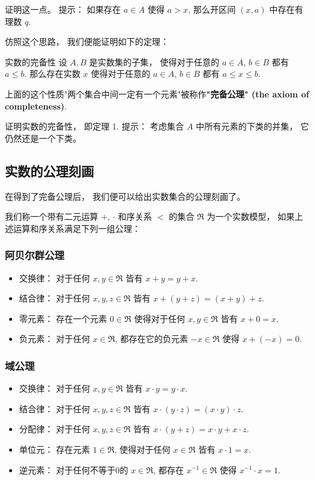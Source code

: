 \begin{exercise}{}
证明这一点。 提示： 如果存在 $a\in A$ 使得 $a>x$, 那么开区间 $(x,a)$ 中存在有理数 $q$.
\end{exercise}

仿照这个思路， 我们便能证明如下的定理：

\begin{theorem}{实数的完备性}\label{Cmplt_the1}
设 $A,B$ 是实数集的子集， 使得对于任意的 $a\in A$, $b\in B$ 都有 $a\leq b$. 那么存在实数 $x$ 使得对于任意的 $a\in A$, $b\in B$ 都有 $a\leq x\leq b$.
\end{theorem}

上面的这个性质"两个集合中间一定有一个元素"被称作\textbf{"完备公理" (the axiom of completeness)}.

\begin{exercise}{}
证明实数的完备性， 即定理 1. 提示： 考虑集合 $A$ 中所有元素的下类的并集， 它仍然还是一个下类。
\end{exercise}

\subsection{实数的公理刻画}

在得到了完备公理后， 我们便可以给出实数集合的公理刻画了。 

我们称一个带有二元运算 $+$, $\cdot$ 和序关系 $<$ 的集合 $\mathfrak{R}$ 为一个实数模型， 如果上述运算和序关系满足下列一组公理：

\subsubsection{阿贝尔群公理}
\begin{itemize}
\item 交换律： 对于任何 $x,y\in\mathfrak{R}$ 皆有 $x+y=y+x$.
\item 结合律： 对于任何 $x,y,z\in\mathfrak{R}$ 皆有 $x+(y+z)=(x+y)+z$.
\item 零元素： 存在一个元素 $0\in \mathfrak{R}$ 使得对于任何 $x,y\in\mathfrak{R}$ 皆有 $x+0=x$.
\item 负元素： 对于任何 $x\in\mathfrak{R}$, 都存在它的负元素 $-x\in\mathfrak{R}$ 使得 $x+(-x)=0$.
\end{itemize}

\subsubsection{域公理}
\begin{itemize}
\item 交换律： 对于任何 $x,y\in\mathfrak{R}$ 皆有 $x\cdot y=y\cdot x$.
\item 结合律： 对于任何 $x,y,z\in\mathfrak{R}$ 皆有 $x\cdot (y\cdot z)=(x\cdot y)\cdot z$.
\item 分配律： 对于任何 $x,y,z\in\mathfrak{R}$ 皆有 $x\cdot (y+z)=x\cdot y+x\cdot z$.
\item 单位元： 存在元素 $1\in\mathfrak{R}$, 使得对于任何 $x\in\mathfrak{R}$ 皆有 $x\cdot 1=x$.
\item 逆元素： 对于任何不等于0的 $x\in\mathfrak{R}$, 都存在 $x^{-1}\in\mathfrak{R}$ 使得 $x^{-1}\cdot x=1$.
\end{itemize}

